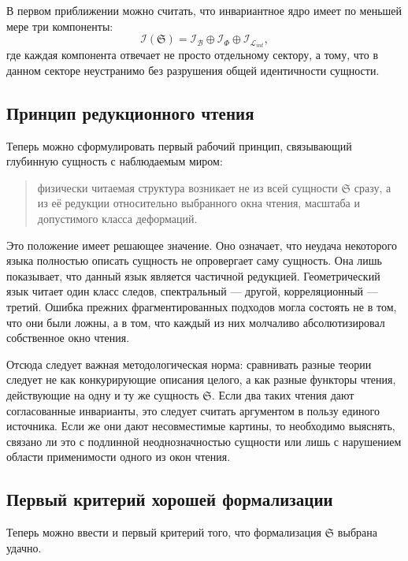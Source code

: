 \documentclass[12pt,a4paper]{article}
\begin{document}
В первом приближении можно считать, что инвариантное ядро имеет по меньшей мере три компоненты:
\begin{equation}
\mathcal{I}(\mathfrak{S}) = \mathcal{I}_{\mathcal{B}} \oplus \mathcal{I}_{\Phi} \oplus \mathcal{I}_{\mathcal{L}_{int}},
\end{equation}
где каждая компонента отвечает не просто отдельному сектору, а тому, что в данном секторе неустранимо без разрушения общей идентичности сущности.

\subsection{Принцип редукционного чтения}

Теперь можно сформулировать первый рабочий принцип, связывающий глубинную сущность с наблюдаемым миром:
\begin{quote}
физически читаемая структура возникает не из всей сущности \(\mathfrak{S}\) сразу, а из её редукции относительно выбранного окна чтения, масштаба и допустимого класса деформаций.
\end{quote}

Это положение имеет решающее значение. Оно означает, что неудача некоторого языка полностью описать сущность не опровергает саму сущность. Она лишь показывает, что данный язык является частичной редукцией. Геометрический язык читает один класс следов, спектральный --- другой, корреляционный --- третий. Ошибка прежних фрагментированных подходов могла состоять не в том, что они были ложны, а в том, что каждый из них молчаливо абсолютизировал собственное окно чтения.

Отсюда следует важная методологическая норма: сравнивать разные теории следует не как конкурирующие описания целого, а как разные функторы чтения, действующие на одну и ту же сущность \(\mathfrak{S}\). Если два таких чтения дают согласованные инварианты, это следует считать аргументом в пользу единого источника. Если же они дают несовместимые картины, то необходимо выяснять, связано ли это с подлинной неоднозначностью сущности или лишь с нарушением области применимости одного из окон чтения.

\subsection{Первый критерий хорошей формализации}

Теперь можно ввести и первый критерий того, что формализация \(\mathfrak{S}\) выбрана удачно.
\end{document}
